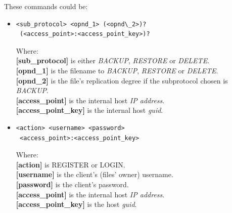 \documentclass[11pt]{article}
\begin{document}
These commands could be:
\begin{itemize}
\item 
\begin{lstlisting}
<sub_protocol> <opnd_1> (<opnd\_2>)?
 (<access_point>:<access_point_key>)?
\end{lstlisting}
Where:\\
\textbf{[sub\_protocol]} is either \textit{BACKUP}, \textit{RESTORE} or \textit{DELETE}.\\
\textbf{[opnd\_1]} is the filename to \textit{BACKUP}, \textit{RESTORE} or \textit{DELETE}.\\
\textbf{[opnd\_2]} is the file's replication degree if the subprotocol chosen is \textit{BACKUP}.\\
\textbf{[access\_point]} is the internal host \textit{IP address}.\\
\textbf{[access\_point\_key]} is the internal host \textit{guid}.\\
\item
\begin{lstlisting}
<action> <username> <password>
 <access_point>:<access_point_key>
\end{lstlisting}
Where:\\
\textbf{[action]} is REGISTER or LOGIN.\\
\textbf{[username]} is the client's (files' owner) username.\\
\textbf{[password]} is the client's password.\\
\textbf{[access\_point]} is the internal host \textit{IP address}.\\
\textbf{[access\_point\_key]} is the host \textit{guid}.
\end{itemize}
\end{document}
